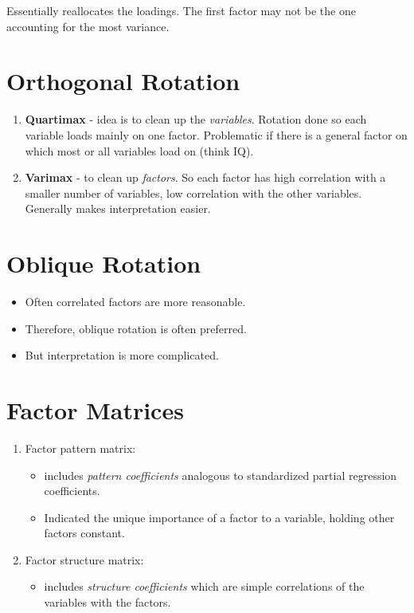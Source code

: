 \documentclass[
]{book}
\providecommand{\tightlist}{%
  \setlength{\itemsep}{0pt}\setlength{\parskip}{0pt}}
\begin{document}
Essentially reallocates the loadings. The first factor may not be the one accounting for the most variance.

\hypertarget{orthogonal-rotation}{%
\section{Orthogonal Rotation}\label{orthogonal-rotation}}

\begin{enumerate}
\def\labelenumi{\arabic{enumi}.}
\item
  \textbf{Quartimax} - idea is to clean up the \emph{variables}. Rotation done so each variable loads mainly on one factor. Problematic if there is a general factor on which most or all variables load on (think IQ).
\item
  \textbf{Varimax} - to clean up \emph{factors}. So each factor has high correlation with a smaller number of variables, low correlation with the other variables. Generally makes interpretation easier.
\end{enumerate}

\hypertarget{oblique-rotation}{%
\section{Oblique Rotation}\label{oblique-rotation}}

\begin{itemize}
\tightlist
\item
  Often correlated factors are more reasonable.
\item
  Therefore, oblique rotation is often preferred.
\item
  But interpretation is more complicated.
\end{itemize}

\hypertarget{factor-matrices}{%
\section{Factor Matrices}\label{factor-matrices}}

\begin{enumerate}
\def\labelenumi{\arabic{enumi}.}
\tightlist
\item
  Factor pattern matrix:

  \begin{itemize}
  \tightlist
  \item
    includes \emph{pattern coefficients} analogous to standardized partial regression coefficients.
  \item
    Indicated the unique importance of a factor to a variable, holding other factors constant.
  \end{itemize}
\item
  Factor structure matrix:

  \begin{itemize}
  \tightlist
  \item
    includes \emph{structure coefficients} which are simple correlations of the variables with the factors.
  \end{itemize}
\end{enumerate}
\end{document}
